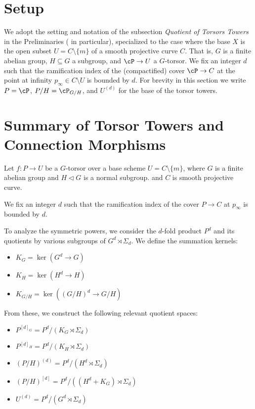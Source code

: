 
\section*{Setup}

We adopt the setting and notation of the subsection \emph{Quotient of Torsors Towers} in the Preliminaries ( in particular), specialized to the case where the base $X$ is the open subset $U = C \setminus \{m\}$ of a smooth projective curve $C$.
That is, $G$ is a finite abelian group, $H \subseteq G$ a subgroup, and $\cP \to U$ a $G$-torsor.
We fix an integer $d$ such that the ramification index of the (compactified) cover $\cP \to C$ at the point at infinity $p_\infty \in C \setminus U$ is bounded by $d$.
For brevity in this section we write $P = \cP$, $P/H = \cP_{G/H}$, and $U^{(d)}$ for the base of the torsor towers.

\section*{Summary of Torsor Towers and Connection Morphisms}

Let $f: P \to U$ be a $G$-torsor over a base scheme $U = C \setminus \{m\}$, where $G$ is a finite abelian group and $H \triangleleft G$ is a normal subgroup. 
and $C$ is smooth projective curve. 

We fix an integer $d$ such that the ramification index of the cover $P \to C$ at $p_\infty$ is bounded by $d$. 

To analyze the symmetric powers, we consider the $d$-fold product $P^d$ and its quotients by various subgroups of $G^d \rtimes \Sigma_d$. We define the summation kernels:
\begin{itemize}
    \item $K_G = \ker(G^d \to G)$
    \item $K_H = \ker(H^d \to H)$
    \item $K_{G/H} = \ker((G/H)^d \to G/H)$
\end{itemize}

From these, we construct the following relevant quotient spaces:
\begin{itemize}
    \item $P^{[d]_G} = P^d / (K_G \rtimes \Sigma_d)$
    \item $P^{[d]_H} = P^d / (K_H \rtimes \Sigma_d)$
    \item $(P/H)^{(d)} = P^d / (H^d \rtimes \Sigma_d)$
    \item $(P/H)^{[d]} = P^d / ((H^d + K_G) \rtimes \Sigma_d)$
    \item $U^{(d)} = P^d / (G^d \rtimes \Sigma_d)$
\end{itemize}

